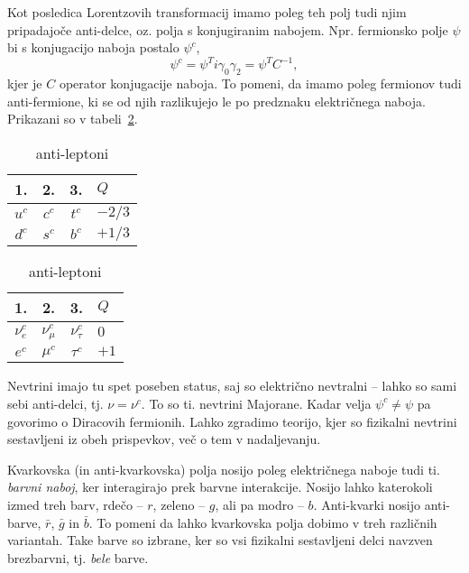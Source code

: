 Kot posledica Lorentzovih transformacij imamo poleg teh polj tudi njim pripadajoče anti-delce, oz.
polja s konjugiranim nabojem. Npr. fermionsko polje $\psi$ bi s konjugacijo naboja postalo $\psi^c$,
\begin{equation}
	\psi^c = \psi^T i\gamma_0\gamma_2 = \psi^T C^{-1},
\end{equation}
kjer je $C$ operator konjugacije naboja. To pomeni, da imamo poleg fermionov tudi anti-fermione,
ki se od njih razlikujejo le po predznaku električnega naboja. Prikazani so v tabeli~\ref{SManti}.
\begin{table}[H]\centering
	\caption{Anti-fermionska polja SM, tj. fermioni s konjugiranim nabojem.}
	\begin{subtable}[H]{0.45\linewidth}\centering
		\begin{tabular}{c c c | l}
			1. & 2. & 3. & $Q$ \\
			\hline
			$u^c$ & $c^c$ & $t^c$ & $-2/3$ \\
			$d^c$ & $s^c$ & $b^c$ & $+1/3$
		\end{tabular}
		\caption{anti-kvarki}
	\end{subtable}
	\begin{subtable}[H]{0.45\linewidth}\centering
		\begin{tabular}{c c c | l}
			1. & 2. & 3. & $Q$ \\
			\hline
			$\nu_e^c$ & $\nu_\mu^c$ & $\nu_\tau^c$ & $0$ \\
			$e^c$ & $\mu^c$ & $\tau^c$ & $+1$
		\end{tabular}
		\caption{anti-leptoni}
	\end{subtable}
	\label{SManti}
\end{table}
Nevtrini imajo tu spet poseben status, saj so električno nevtralni -- lahko so sami sebi anti-delci,
tj. $\nu = \nu^c$. To so ti. nevtrini Majorane. Kadar velja $\psi^c \neq \psi$ pa govorimo o Diracovih
fermionih. Lahko zgradimo teorijo, kjer so fizikalni nevtrini sestavljeni iz obeh prispevkov, več
o tem v nadaljevanju.

Kvarkovska (in anti-kvarkovska) polja nosijo poleg električnega naboje tudi ti. \emph{barvni naboj},
ker interagirajo prek barvne interakcije. Nosijo lahko katerokoli izmed treh barv, rdečo -- $r$,
zeleno -- $g$, ali pa modro -- $b$. Anti-kvarki nosijo anti-barve, $\bar{r}$, $\bar{g}$ in $\bar{b}$.
To pomeni da lahko kvarkovska polja dobimo v treh različnih variantah. Take barve so izbrane, ker so
vsi fizikalni sestavljeni delci navzven brezbarvni, tj. \emph{bele} barve.

